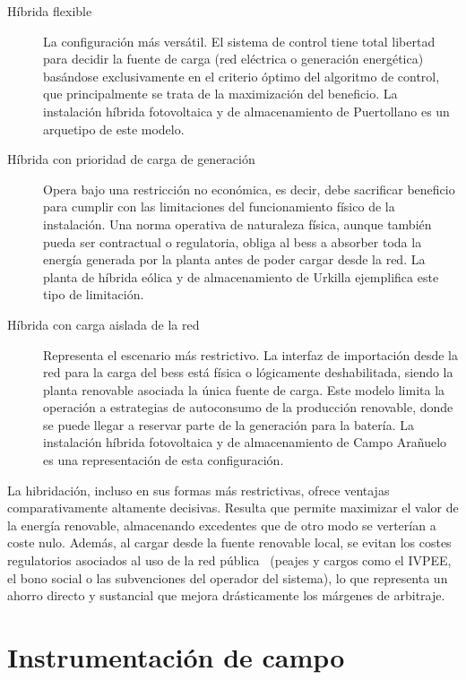 \begin{description}

  \item[Híbrida flexible] La configuración más versátil. El sistema de control tiene total libertad para decidir la fuente de carga (red eléctrica o generación energética) basándose exclusivamente en el criterio óptimo del algoritmo de control, que principalmente se trata de la maximización del beneficio. La instalación híbrida fotovoltaica y de almacenamiento de Puertollano es un arquetipo de este modelo.

  \item[Híbrida con prioridad de carga de generación] Opera bajo una restricción no económica, es decir, debe sacrificar beneficio para cumplir con las limitaciones del funcionamiento físico de la instalación. Una norma operativa de naturaleza física, aunque también pueda ser contractual o regulatoria, obliga al \gls{bess} a absorber toda la energía generada por la planta antes de poder cargar desde la red. La planta de híbrida eólica y de almacenamiento de Urkilla ejemplifica este tipo de limitación.

  \item[Híbrida con carga aislada de la red] Representa el escenario más restrictivo. La interfaz de importación desde la red para la carga del \gls{bess} está física o lógicamente deshabilitada, siendo la planta renovable asociada la única fuente de carga. Este modelo limita la operación a estrategias de autoconsumo de la producción renovable, donde se puede llegar a reservar parte de la generación para la batería. La instalación híbrida fotovoltaica y de almacenamiento de Campo Arañuelo es una representación de esta configuración.

\end{description}

La hibridación, incluso en sus formas más restrictivas, ofrece ventajas comparativamente altamente decisivas. Resulta que permite maximizar el valor de la energía renovable, almacenando excedentes que de otro modo se verterían a coste nulo. Además, al cargar desde la fuente renovable local, se evitan los costes regulatorios asociados al uso de la red pública~\cite{mterd2024orden} (peajes y cargos como el IVPEE, el bono social o las subvenciones del operador del sistema), lo que representa un ahorro directo y sustancial que mejora drásticamente los márgenes de arbitraje.

\section{Instrumentación de campo}%
\label{makereference3.2}

